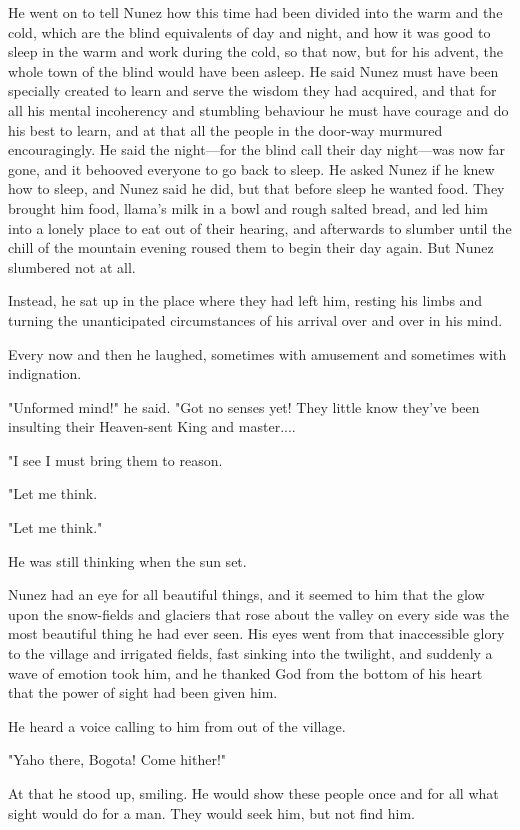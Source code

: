 \documentclass[courier]{sffms}
\begin{document}
He went on to tell Nunez how this time had been divided into the warm
and the cold, which are the blind equivalents of day and night, and
how it was good to sleep in the warm and work during the cold, so that
now, but for his advent, the whole town of the blind would have been
asleep. He said Nunez must have been specially created to learn and
serve the wisdom they had acquired, and that for all his mental
incoherency and stumbling behaviour he must have courage and do his
best to learn, and at that all the people in the door-way murmured
encouragingly. He said the night---for the blind call their day
night---was now far gone, and it behooved everyone to go back to
sleep. He asked Nunez if he knew how to sleep, and Nunez said he did,
but that before sleep he wanted food.  They brought him food, llama's
milk in a bowl and rough salted bread, and led him into a lonely place
to eat out of their hearing, and afterwards to slumber until the chill
of the mountain evening roused them to begin their day again.  But
Nunez slumbered not at all.

Instead, he sat up in the place where they had left him, resting his
limbs and turning the unanticipated circumstances of his arrival over
and over in his mind.

Every now and then he laughed, sometimes with amusement and sometimes
with indignation.

"Unformed mind!" he said. "Got no senses yet! They little know they've
been insulting their Heaven-sent King and master....

"I see I must bring them to reason.

"Let me think.

"Let me think."

He was still thinking when the sun set.

Nunez had an eye for all beautiful things, and it seemed to him that
the glow upon the snow-fields and glaciers that rose about the valley
on every side was the most beautiful thing he had ever seen. His eyes
went from that inaccessible glory to the village and irrigated fields,
fast sinking into the twilight, and suddenly a wave of emotion took
him, and he thanked God from the bottom of his heart that the power of
sight had been given him.

He heard a voice calling to him from out of the village.

"Yaho there, Bogota! Come hither!"

At that he stood up, smiling. He would show these people once and for
all what sight would do for a man. They would seek him, but not find
him.
\end{document}
